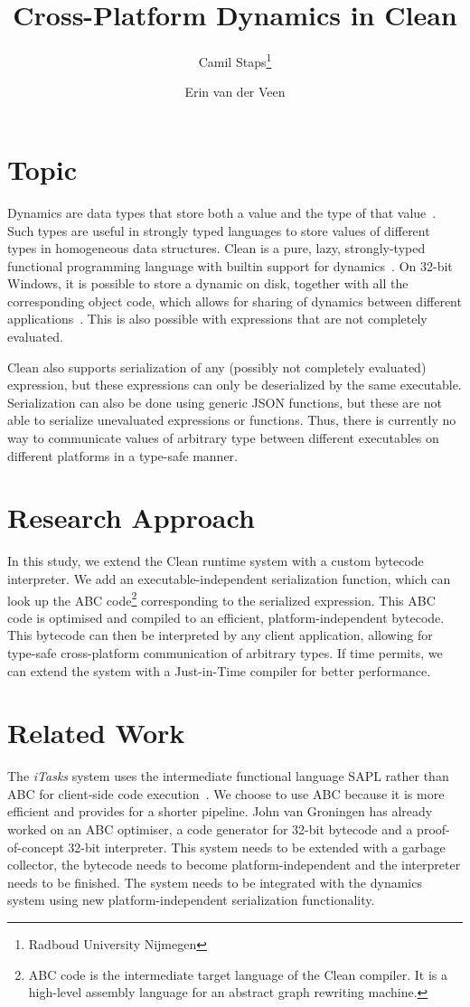 \documentclass[a4paper]{article}
\title{Cross-Platform Dynamics in Clean}
\author{Camil Staps\footnote{Radboud University Nijmegen} \and Erin van der Veen\footnotemark[1]}
\begin{document}
\maketitle

\section*{Topic}
Dynamics are data types that store both a value and the type of that value~\cites{Abadi1991,Leroy1993,Abadi1995,Pil1998}.
Such types are useful in strongly typed languages to store values of different types in homogeneous data structures.
Clean is a pure, lazy, strongly-typed functional programming language with builtin support for dynamics~\citep{CleanLang}.
On 32-bit Windows, it is possible to store a dynamic on disk, together with all the corresponding object code,
	which allows for sharing of dynamics between different applications~\citep{Vervoort2002}.
This is also possible with expressions that are not completely evaluated.

Clean also supports serialization of any (possibly not completely evaluated) expression,
	but these expressions can only be deserialized by the same executable.
Serialization can also be done using generic JSON functions, but these are not able to serialize unevaluated expressions or functions.
Thus, there is currently no way to communicate values of arbitrary type between different executables on different platforms in a type-safe manner.

\section*{Research Approach}
In this study, we extend the Clean runtime system with a custom bytecode interpreter.
We add an executable-independent serialization function,
	which can look up the ABC code\footnote{ABC code is the intermediate target language of the Clean compiler. It is a high-level assembly language for an abstract graph rewriting machine.} corresponding to the serialized expression.
This ABC code is optimised and compiled to an efficient, platform-independent bytecode.
This bytecode can then be interpreted by any client application, allowing for type-safe cross-platform communication of arbitrary types.
If time permits, we can extend the system with a Just-in-Time compiler for better performance.

\section*{Related Work}
The \emph{iTasks} system uses the intermediate functional language SAPL rather than ABC for client-side code execution~\cites{Jansen2006,Plasmeijer2008}.
We choose to use ABC because it is more efficient and provides for a shorter pipeline.
John van Groningen has already worked on an ABC optimiser, a code generator for 32-bit bytecode and a proof-of-concept 32-bit interpreter.
This system needs to be extended with a garbage collector, the bytecode needs to become platform-independent and the interpreter needs to be finished.
The system needs to be integrated with the dynamics system using new platform-independent serialization functionality.

\printbibliography
\end{document}
